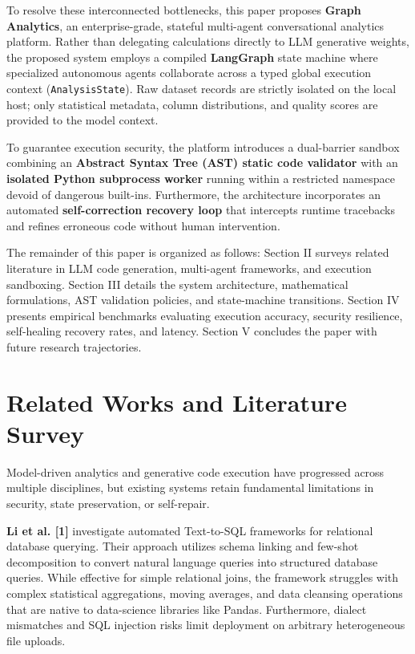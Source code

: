 \documentclass[conference]{IEEEtran}
\begin{document}
To resolve these interconnected bottlenecks, this paper proposes \textbf{Graph Analytics}, an enterprise-grade, stateful multi-agent conversational analytics platform. Rather than delegating calculations directly to LLM generative weights, the proposed system employs a compiled \textbf{LangGraph} state machine where specialized autonomous agents collaborate across a typed global execution context (\texttt{AnalysisState}). Raw dataset records are strictly isolated on the local host; only statistical metadata, column distributions, and quality scores are provided to the model context. 

To guarantee execution security, the platform introduces a dual-barrier sandbox combining an \textbf{Abstract Syntax Tree (AST) static code validator} with an \textbf{isolated Python subprocess worker} running within a restricted namespace devoid of dangerous built-ins. Furthermore, the architecture incorporates an automated \textbf{self-correction recovery loop} that intercepts runtime tracebacks and refines erroneous code without human intervention.

The remainder of this paper is organized as follows: Section II surveys related literature in LLM code generation, multi-agent frameworks, and execution sandboxing. Section III details the system architecture, mathematical formulations, AST validation policies, and state-machine transitions. Section IV presents empirical benchmarks evaluating execution accuracy, security resilience, self-healing recovery rates, and latency. Section V concludes the paper with future research trajectories.

\section{Related Works and Literature Survey}
Model-driven analytics and generative code execution have progressed across multiple disciplines, but existing systems retain fundamental limitations in security, state preservation, or self-repair.

\textbf{Li et al. [1]} investigate automated Text-to-SQL frameworks for relational database querying. Their approach utilizes schema linking and few-shot decomposition to convert natural language queries into structured database queries. While effective for simple relational joins, the framework struggles with complex statistical aggregations, moving averages, and data cleansing operations that are native to data-science libraries like Pandas. Furthermore, dialect mismatches and SQL injection risks limit deployment on arbitrary heterogeneous file uploads.
\end{document}

